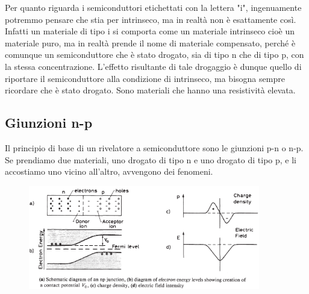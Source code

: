 Per quanto riguarda i semiconduttori etichettati con la lettera "i", ingenuamente potremmo pensare che stia per intrinseco, ma in realtà non è esattamente così. Infatti un materiale di tipo i si comporta come un materiale intrinseco cioè un materiale puro, ma in realtà prende il nome di materiale compensato, perché è comunque un semiconduttore che è stato drogato, sia di tipo n che di tipo p, con la stessa concentrazione. L'effetto risultante di tale drogaggio è dunque quello di riportare il semiconduttore alla condizione di intrinseco, ma bisogna sempre ricordare che è stato drogato. Sono materiali che hanno una resistività elevata.

\subsection{Giunzioni n-p}
Il principio di base di un rivelatore a semiconduttore sono le giunzioni p-n o n-p. Se prendiamo due materiali, uno drogato di tipo n e uno drogato di tipo p, e li accostiamo uno vicino all'altro, avvengono dei fenomeni. 
\begin{figure}[H]
   \centering
   \includegraphics[width=0.9\textwidth]{immagini/giunzione_p-n.png}
\end{figure}
